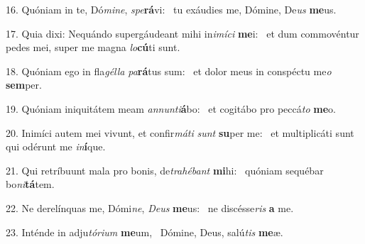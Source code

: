16. Quóniam in te, Dó\textit{mi}\textit{ne}, \textit{spe}\textbf{rá}vi: \ast\  tu exáudies me, Dómine, De\textit{us} \textbf{me}us.\

17. Quia dixi: Nequándo supergáudeant mihi in\textit{i}\textit{mí}\textit{ci} \textbf{me}i: \ast\  et dum commovéntur pedes mei, super me magna \textit{lo}\textbf{cú}ti sunt.\

18. Quóniam ego in fla\textit{gél}\textit{la} \textit{pa}\textbf{rá}tus sum: \ast\  et dolor meus in conspéctu me\textit{o} \textbf{sem}per.\

19. Quóniam iniquitátem meam \textit{an}\textit{nun}\textit{ti}\textbf{á}bo: \ast\  et cogitábo pro peccá\textit{to} \textbf{me}o.\

20. Inimíci autem mei vivunt, et confir\textit{má}\textit{ti} \textit{sunt} \textbf{su}per me: \ast\  et multiplicáti sunt qui odérunt me \textit{in}\textbf{í}que.\

21. Qui retríbuunt mala pro bonis, de\textit{tra}\textit{hé}\textit{bant} \textbf{mi}hi: \ast\  quóniam sequébar bo\textit{ni}\textbf{tá}tem.\

22. Ne derelínquas me, Dómi\textit{ne}, \textit{De}\textit{us} \textbf{me}us: \ast\  ne discésse\textit{ris} \textbf{a} me.\

23. Inténde in adju\textit{tó}\textit{ri}\textit{um} \textbf{me}um, \ast\  Dómine, Deus, salú\textit{tis} \textbf{me}æ.\

